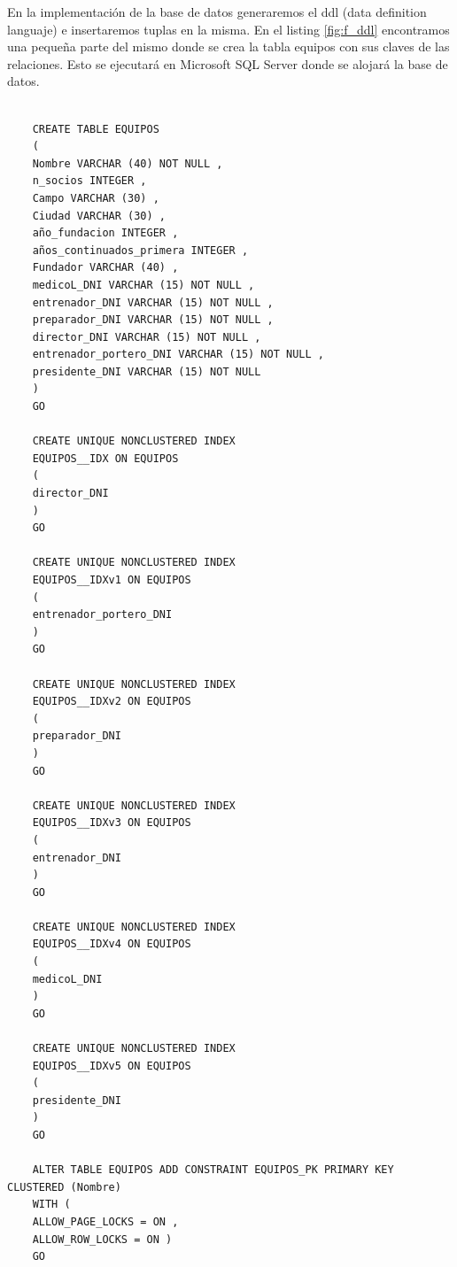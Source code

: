 \documentclass{article}
\begin{document}
En la implementación de la base de datos generaremos el ddl (data definition languaje) e insertaremos tuplas en la misma. En el listing \ref{fig:f_ddl} encontramos una pequeña parte del mismo donde se crea la tabla equipos con sus claves de las relaciones. Esto se ejecutará en Microsoft SQL Server \cite{sqlserver2022} donde se alojará la base de datos.
\begin{lstlisting}[style=ddlstyle, label=fig:f_ddl,caption=Definicion De Datos De La Liga de Fútbol]
	
	CREATE TABLE EQUIPOS 
	(
	Nombre VARCHAR (40) NOT NULL , 
	n_socios INTEGER , 
	Campo VARCHAR (30) , 
	Ciudad VARCHAR (30) , 
	año_fundacion INTEGER , 
	años_continuados_primera INTEGER , 
	Fundador VARCHAR (40) , 
	medicoL_DNI VARCHAR (15) NOT NULL , 
	entrenador_DNI VARCHAR (15) NOT NULL , 
	preparador_DNI VARCHAR (15) NOT NULL , 
	director_DNI VARCHAR (15) NOT NULL , 
	entrenador_portero_DNI VARCHAR (15) NOT NULL , 
	presidente_DNI VARCHAR (15) NOT NULL 
	)
	GO 
	
	CREATE UNIQUE NONCLUSTERED INDEX 
	EQUIPOS__IDX ON EQUIPOS 
	( 
	director_DNI 
	) 
	GO 
	
	CREATE UNIQUE NONCLUSTERED INDEX 
	EQUIPOS__IDXv1 ON EQUIPOS 
	( 
	entrenador_portero_DNI 
	) 
	GO 	
	
	CREATE UNIQUE NONCLUSTERED INDEX 
	EQUIPOS__IDXv2 ON EQUIPOS 
	( 
	preparador_DNI 
	) 
	GO 
	
	CREATE UNIQUE NONCLUSTERED INDEX 
	EQUIPOS__IDXv3 ON EQUIPOS 
	( 
	entrenador_DNI 
	) 
	GO 
	
	CREATE UNIQUE NONCLUSTERED INDEX 
	EQUIPOS__IDXv4 ON EQUIPOS 
	( 
	medicoL_DNI 
	) 
	GO 
		
	CREATE UNIQUE NONCLUSTERED INDEX 
	EQUIPOS__IDXv5 ON EQUIPOS 
	( 
	presidente_DNI 
	) 
	GO
	
	ALTER TABLE EQUIPOS ADD CONSTRAINT EQUIPOS_PK PRIMARY KEY CLUSTERED (Nombre)
	WITH (
	ALLOW_PAGE_LOCKS = ON , 
	ALLOW_ROW_LOCKS = ON )
	GO
	
\end{lstlisting}
	
\end{document}
